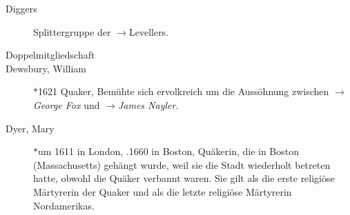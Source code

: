 \begin{description}
\item[Diggers] Splittergruppe der $\to$Levellers.

 \item[Doppelmitgliedschaft]

 \item[Dewsbury, William] $\ast$1621  Quaker, Bemühte sich ervolkreich um die Aussöhnung zwischen $\to$\textit{George Fox} und $\to$\textit{James Nayler}.

 \item[Dyer, Mary] $\ast$um 1611 in London, .1660 in Boston, Quäkerin, die in Boston (Massachusetts) gehängt wurde, weil sie die Stadt wiederholt betreten hatte, obwohl die Quäker verbannt waren. Sie gilt als die erste religiöse Märtyrerin der Quaker und als die letzte religiöse Märtyrerin Nordamerikas.

 \end{description}

\normalsize